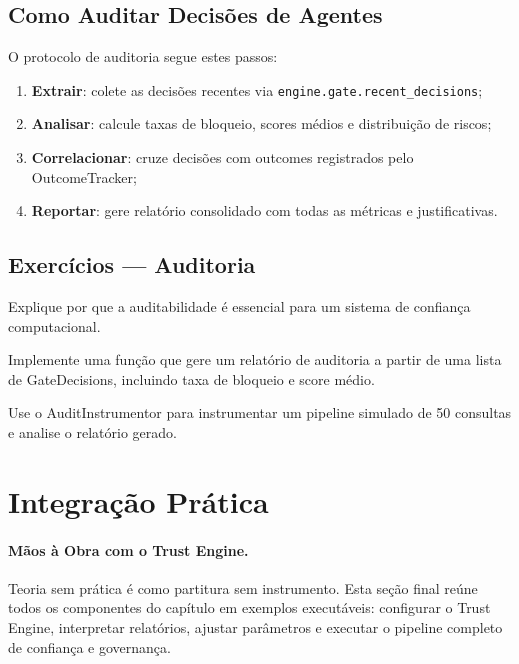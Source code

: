 \subsection{Como Auditar Decisões de Agentes}

O protocolo de auditoria segue estes passos:
\begin{enumerate}
\item \textbf{Extrair}: colete as decisões recentes via
\lstinline{engine.gate.recent_decisions};
\item \textbf{Analisar}: calcule taxas de bloqueio, scores médios e
distribuição de riscos;
\item \textbf{Correlacionar}: cruze decisões com outcomes registrados
pelo OutcomeTracker;
\item \textbf{Reportar}: gere relatório consolidado com todas as
métricas e justificativas.
\end{enumerate}

\subsection{Exercícios — Auditoria}
\begin{exercicio}
Explique por que a auditabilidade é essencial para um sistema de
confiança computacional.
\end{exercicio}
\begin{exercicio}
Implemente uma função que gere um relatório de auditoria a partir de
uma lista de GateDecisions, incluindo taxa de bloqueio e score médio.
\end{exercicio}
\begin{exercicio}
Use o AuditInstrumentor para instrumentar um pipeline simulado de 50
consultas e analise o relatório gerado.
\end{exercicio}

\section{Integração Prática}
\label{sec:integracao-pratica}
\nivelbasico

\paragraph{Mãos à Obra com o Trust Engine.}
Teoria sem prática é como partitura sem instrumento.
Esta seção final reúne todos os componentes do capítulo
em exemplos executáveis: configurar o Trust Engine,
interpretar relatórios, ajustar parâmetros e executar
o pipeline completo de confiança e governança.

